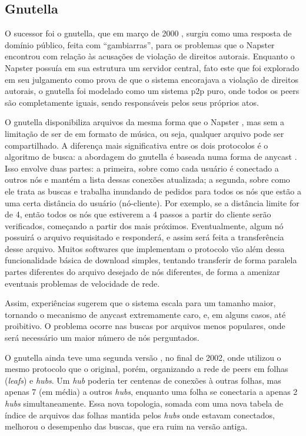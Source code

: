 \subsection{Gnutella}

O sucessor foi o \gls{gnutella}, que em março de 2000 \cite{wiki:gnutella}, surgiu como
uma resposta de domínio público, feita com ``gambiarras'', para os problemas que o
Napster encontrou com relação às acusações de violação de direitos autorais. Enquanto o
Napster possuía em sua estrutura um servidor central, fato este que foi explorado em
seu julgamento como prova de que o sistema encorajava a violação de direitos autorais,
o \gls*{gnutella} foi modelado como um sistema \gls*{p2p} puro, onde todos os
\glspl*{peer} são completamente iguais, sendo responsáveis pelos seus próprios atos.

O \gls*{gnutella} disponibiliza arquivos da mesma forma que o Napster \cite{book:birman}
, mas sem a limitação de ser de em formato de música, ou seja, qualquer arquivo pode
ser compartilhado. A diferença mais significativa entre os dois protocolos é o
algoritmo de busca: a abordagem do \gls*{gnutella} é baseada numa forma de \gls{anycast}
. Isso envolve duas partes: a primeira, sobre como cada usuário é conectado a outros
nós e mantém a lista dessas conexões atualizada; a segunda, sobre como ele trata as
buscas e trabalha inundando de pedidos para todos os nós que estão a uma certa
distância do usuário (nó-cliente). Por exemplo, se a distância limite for de 4, então
todos os nós que estiverem a 4 passos a partir do cliente serão verificados, começando
a partir dos mais próximos. Eventualmente, algum nó possuirá o arquivo requisitado e
responderá, e assim será feita a transferência desse arquivo. Muitos softwares que
implementam o protocolo vão além dessa funcionalidade básica de download simples,
tentando transferir de forma paralela partes diferentes do arquivo desejado de nós
diferentes, de forma a amenizar eventuais problemas de velocidade de rede.

Assim, experiências sugerem que o sistema escala para um tamanho maior, tornando o
mecanismo de \gls*{anycast} extremamente caro, e, em alguns casos, até proibitivo. O
problema ocorre nas buscas por arquivos menos populares, onde será necessário um maior
número de nós perguntados.

O \gls*{gnutella} ainda teve uma segunda versão \cite{wiki:gnutella2}, no final de 2002,
onde utilizou o mesmo protocolo que o original, porém, organizando a rede de
\glspl*{peer} em folhas (\emph{leafs}) e \emph{hubs}. Um \emph{hub} poderia
ter centenas de conexões à outras folhas, mas apenas 7 (em média) a outros \emph{hubs},
enquanto uma folha se conectaria a apenas 2 \emph{hubs} simultaneamente. Essa nova
topologia, somada com uma nova tabela de índice de arquivos das folhas mantida pelos
\emph{hubs} onde estavam conectados, melhorou o desempenho das buscas, que era ruim na versão antiga.

